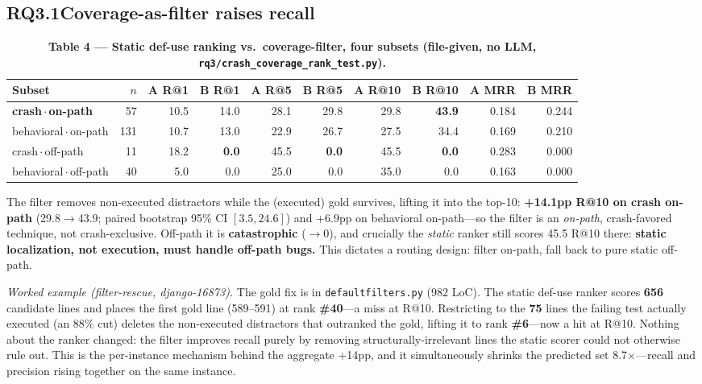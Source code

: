 \documentclass[11pt]{article}
\newcommand{\code}[1]{\texttt{#1}}
\begin{document}
\subsection*{RQ3.1\quad Coverage-as-filter raises recall}
\begin{table}[t]
\centering\footnotesize
\caption*{\textbf{Table 4 --- Static def-use ranking vs.\ coverage-filter, four subsets (file-given, no LLM, \code{rq3/crash\_coverage\_rank\_test.py}).}}
\setlength{\tabcolsep}{4.5pt}
\begin{tabular}{lrrrrrrrrr}
\toprule
Subset & $n$ & A R@1 & B R@1 & A R@5 & B R@5 & A R@10 & B R@10 & A MRR & B MRR \\
\midrule
\textbf{crash\,$\cdot$\,on-path} & 57 & 10.5 & 14.0 & 28.1 & 29.8 & 29.8 & \textbf{43.9} & 0.184 & 0.244 \\
behavioral\,$\cdot$\,on-path & 131 & 10.7 & 13.0 & 22.9 & 26.7 & 27.5 & 34.4 & 0.169 & 0.210 \\
crash\,$\cdot$\,off-path & 11 & 18.2 & \textbf{0.0} & 45.5 & \textbf{0.0} & 45.5 & \textbf{0.0} & 0.283 & 0.000 \\
behavioral\,$\cdot$\,off-path & 40 & 5.0 & 0.0 & 25.0 & 0.0 & 35.0 & 0.0 & 0.163 & 0.000 \\
\bottomrule
\end{tabular}
\end{table}

The filter removes non-executed distractors while the (executed) gold survives, lifting it into the top-10: \textbf{+14.1pp R@10 on crash on-path} (29.8$\rightarrow$43.9; paired bootstrap 95\% CI $[3.5, 24.6]$) and +6.9pp on behavioral on-path---so the filter is an \emph{on-path}, crash-favored technique, not crash-exclusive. Off-path it is \textbf{catastrophic} ($\rightarrow$0), and crucially the \emph{static} ranker still scores 45.5 R@10 there: \textbf{static localization, not execution, must handle off-path bugs.} This dictates a routing design: filter on-path, fall back to pure static off-path.

\emph{Worked example (filter-rescue, django-16873).} The gold fix is in \code{defaultfilters.py} (982 LoC). The static def-use ranker scores \textbf{656} candidate lines and places the first gold line (589--591) at rank \textbf{\#40}---a miss at R@10. Restricting to the \textbf{75} lines the failing test actually executed (an 88\% cut) deletes the non-executed distractors that outranked the gold, lifting it to rank \textbf{\#6}---now a hit at R@10. Nothing about the ranker changed: the filter improves recall purely by removing structurally-irrelevant lines the static scorer could not otherwise rule out. This is the per-instance mechanism behind the aggregate +14pp, and it simultaneously shrinks the predicted set 8.7$\times$---recall and precision rising together on the same instance.
\end{document}
